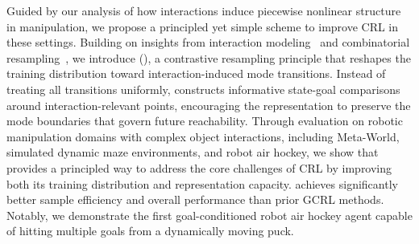 
Guided by our analysis of how interactions induce piecewise nonlinear structure in manipulation, we propose a principled yet simple scheme to improve CRL in these settings. Building on insights from interaction modeling~\citep{chuck2023granger, hwang2024fine, chuck2025null, lei2026spartan} and combinatorial resampling~\citep{kim2024enhancing, ziarko2026contrastive}, we introduce \methodname{} (\methodshort{}), a contrastive resampling principle that reshapes the training distribution toward interaction-induced mode transitions. Instead of treating all transitions uniformly, \methodshort{} constructs informative state-goal comparisons around interaction-relevant points, encouraging the representation to preserve the mode boundaries that govern future reachability. 
Through evaluation on robotic manipulation domains with complex object interactions, including Meta-World, simulated dynamic maze environments, and robot air hockey, we show that \methodshort{} provides a principled way to address the core challenges of CRL by improving both its training distribution and representation capacity. \methodshort{} achieves significantly better sample efficiency and overall performance than prior GCRL methods. Notably, we demonstrate the first goal-conditioned robot air hockey agent capable of hitting multiple goals from a dynamically moving puck.


